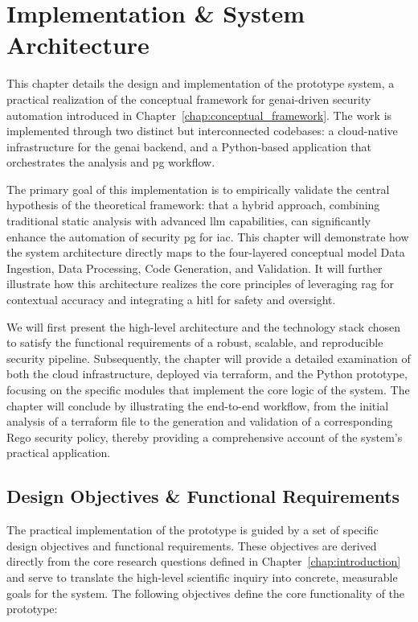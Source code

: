 \chapter{Implementation \& System Architecture}
\label{chap:implementation}

This chapter details the design and implementation of the prototype system, a practical realization of the conceptual framework for \gls{genai}-driven security automation introduced in Chapter~\ref{chap:conceptual_framework}. The work is implemented through two distinct but interconnected codebases: a cloud-native infrastructure for the \gls{genai} backend, and a Python-based application that orchestrates the analysis and \gls{pg} workflow.

The primary goal of this implementation is to empirically validate the central hypothesis of the theoretical framework: that a hybrid approach, combining traditional static analysis with advanced \gls{llm} capabilities, can significantly enhance the automation of security \gls{pg} for \gls{iac}. This chapter will demonstrate how the system architecture directly maps to the four-layered conceptual model Data Ingestion, Data Processing, Code Generation, and Validation. It will further illustrate how this architecture realizes the core principles of leveraging \gls{rag} for contextual accuracy and integrating a \gls{hitl} for safety and oversight.

We will first present the high-level architecture and the technology stack chosen to satisfy the functional requirements of a robust, scalable, and reproducible security pipeline. Subsequently, the chapter will provide a detailed examination of both the cloud infrastructure, deployed via \gls{terraform}, and the Python prototype, focusing on the specific modules that implement the core logic of the system. The chapter will conclude by illustrating the end-to-end workflow, from the initial analysis of a \gls{terraform} file to the generation and validation of a corresponding Rego security policy, thereby providing a comprehensive account of the system's practical application.

\section{Design Objectives \& Functional Requirements}

The practical implementation of the prototype is guided by a set of specific design objectives and functional requirements. These objectives are derived directly from the core research questions defined in Chapter~\ref{chap:introduction} and serve to translate the high-level scientific inquiry into concrete, measurable goals for the system. The following objectives define the core functionality of the prototype:

